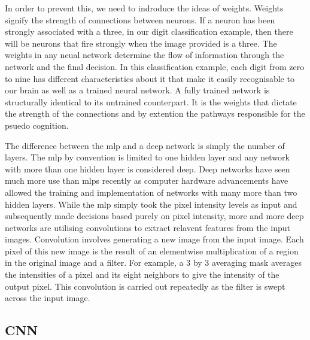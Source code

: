 \documentclass{article}
\begin{document}
In order to prevent this, we need to indroduce the ideas of weights. Weights signify the strength of connections between neurons.
If a neuron has been strongly associated with a three, in our digit classification example, then there will be neurons that fire strongly when the image provided is a three.
The weights in any neual network determine the flow of information through the network and the final decision.
In this classification example, each digit from zero to nine has different characteristics about it that make it easily recognisable to our brain as well as a trained neural network.
A fully trained network is structurally identical to its untrained counterpart. It is the weights that dictate the strength of the connections and by extention the pathways responsible for the psuedo cognition.
\par
The difference between the mlp and a deep network is simply the number of layers.
The mlp by convention is limited to one hidden layer and any network with more than one hidden layer is considered deep.
Deep networks have seen much more use than mlps recently as computer hardware advancements have allowed the training and implementation of networks with many more than two hidden layers.
While the mlp simply took the pixel intensity levels as input and subsequently made decisions based purely on pixel intensity, more and more deep networks are utilising convolutions to extract relavent features from the input images.
Convolution involves generating a new image from the input image. Each pixel of this new image is the result of an elementwise multiplication of a region in the original image and a filter.
For example, a 3 by 3 averaging mask averages the intensities of a pixel and its eight neighbors to give the intensity of the output pixel.
This convolution is carried out repeatedly as the filter is swept across the input image.
\subsection{CNN}
\paragraph{}
\end{document}
